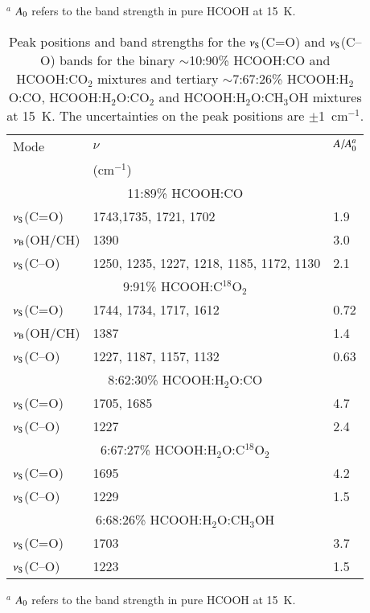 \documentclass{aa}
\begin{document}
\begin{appendix}
\begin{table*}
$^a$ $A_{\rm0}$ refers to the band strength in pure HCOOH at 15~K.
\end{table*}

\begin{table*}
\caption{Peak positions and band strengths for the $\nu_{\rm S}$(C=O)
and $\nu_{\rm S}$(C--O) bands for the binary $\sim$10:90\% HCOOH:CO
and HCOOH:CO$_2$ mixtures and tertiary $\sim$7:67:26\%
HCOOH:H$_2$O:CO, HCOOH:H$_2$O:CO$_2$ and HCOOH:H$_2$O:CH$_3$OH
mixtures at 15~K. The uncertainties on the peak positions are
$\pm$1~cm$^{-1}$.}\label{nuc=o}
\begin{tabular}{l|ll}
\hline
\hline
Mode & $\nu$  & $A/A_{\rm 0}^a$\\
     & (cm$^{-1}$)  & \\
\hline 
\multicolumn{3}{c}{11:89\% HCOOH:CO}\\
\hline
$\nu_{\rm S}$(C=O) & 1743,1735, 1721, 1702 & 1.9\\
$\nu_{\rm B}$(OH/CH) & 1390              & 3.0\\
$\nu_{\rm S}$(C--O) & 1250, 1235, 1227, 1218, 1185, 1172, 1130 & 2.1\\
\hline
\multicolumn{3}{c}{9:91\% HCOOH:C$^{18}$O$_2$}\\
\hline
$\nu_{\rm S}$(C=O) & 1744, 1734, 1717, 1612 & 0.72\\
$\nu_{\rm B}$(OH/CH) & 1387 & 1.4\\
$\nu_{\rm S}$(C--O) & 1227, 1187, 1157, 1132 & 0.63\\
\hline
\multicolumn{3}{c}{8:62:30\% HCOOH:H$_2$O:CO}\\
\hline
$\nu_{\rm S}$(C=O) & 1705, 1685 & 4.7\\
$\nu_{\rm S}$(C--O) & 1227 & 2.4\\
\hline
\multicolumn{3}{c}{6:67:27\% HCOOH:H$_2$O:C$^{18}$O$_2$}\\
\hline
$\nu_{\rm S}$(C=O) & 1695 & 4.2\\
$\nu_{\rm S}$(C--O) & 1229 & 1.5\\
\hline
\multicolumn{3}{c}{6:68:26\% HCOOH:H$_2$O:CH$_3$OH}\\
\hline
$\nu_{\rm S}$(C=O) & 1703 & 3.7\\
$\nu_{\rm S}$(C--O) & 1223 & 1.5\\
\hline
\end{tabular}

$^a$ $A_{\rm0}$ refers to the band strength in pure HCOOH at 15~K.
\end{table*}

\end{appendix}
\end{document}
